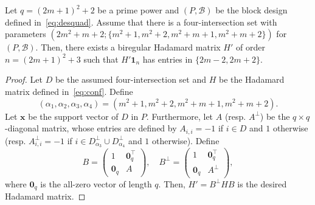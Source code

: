 \documentclass[ALCO,ThmDefs,Unicode]{cedram}
\newcommand*\tra{\top}
\newcommand*{\un}{\mathbf{1}}
\newcommand*{\bfx}{\mathbf{x}}
\newcommand*{\bfo}{\mathbf{0}}
\begin{document}
\begin{prop}\label{prop:const1}
Let $q=(2m+1)^2+2$ be a prime power and $(P,{\mathcal B})$ be the block design defined in~\eqref{eq:desquad}. Assume that there is a four-intersection set with parameters $(2m^2+m+2;\{m^2+1,m^2+2,m^2+m+1,m^2+m+2\})$ for $(P,{\mathcal B})$. Then, there exists a biregular Hadamard matrix $H'$ of order $n=(2m+1)^2+3$ such that $H'\un_n$ has entries in $\{2m-2,2m+2\}$.
\end{prop}
\begin{proof}
Let $D$ be the assumed four-intersection set and $H$ be the Hadamard matrix defined in~\eqref{eq:conf}. Define
\[
(\alpha_1,\alpha_2,\alpha_3,\alpha_4)=(m^2+1,m^2+2,m^2+m+1,m^2+m+2).
\]
Let $\bfx$ be the support vector of $D$ in $P$. Furthermore, let $A$ (resp. $A^\perp$) be the $q\times q$-diagonal matrix, whose entries are defined by $A_{i,i}=-1$ if $i\in D$ and $1$ otherwise (resp. $A^\perp_{i,i}=-1$ if $i\in D_{\alpha_3}^\perp \cup D_{\alpha_4}^\perp$ and $1$ otherwise). Define
\[
B=
\begin{pmatrix} 1 & \bfo_q^\tra \\ \bfo_q & A
\end{pmatrix}, \quad
B^\perp=
\begin{pmatrix} 1 & \bfo_q^\tra \\ \bfo_q & A^\perp
\end{pmatrix},
\]
where $\bfo_q$ is the all-zero vector of length $q$. Then, $H'=B^\perp H B$ is the desired Hadamard matrix.


\end{proof}
\end{document}
